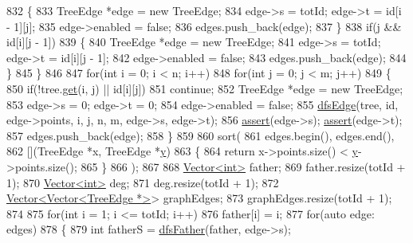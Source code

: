 \begin{DoxyCode}
832             \{
833                 TreeEdge *edge = \textcolor{keyword}{new} TreeEdge;
834                 edge->s = totId; edge->t = \textcolor{keywordtype}{id}[i - 1][j];
835                 edge->enabled = \textcolor{keyword}{false};
836                 edges.push\_back(edge);
837             \}
838             \textcolor{keywordflow}{if}(j && \textcolor{keywordtype}{id}[i][j - 1])
839             \{
840                 TreeEdge *edge = \textcolor{keyword}{new} TreeEdge;
841                 edge->s = totId; edge->t = \textcolor{keywordtype}{id}[i][j - 1];
842                 edge->enabled = \textcolor{keyword}{false};
843                 edges.push\_back(edge);
844             \}
845         \}
846     
847     \textcolor{keywordflow}{for}(\textcolor{keywordtype}{int} i = 0; i < n; i++)
848         \textcolor{keywordflow}{for}(\textcolor{keywordtype}{int} j = 0; j < m; j++)
849         \{
850             \textcolor{keywordflow}{if}(!tree.\hyperlink{classBitMatrix_ad19d1045b54ccc8a99d70d38305b4ca6}{get}(i, j) || \textcolor{keywordtype}{id}[i][j])
851                 \textcolor{keywordflow}{continue};
852             TreeEdge *edge = \textcolor{keyword}{new} TreeEdge;
853             edge->s = 0; edge->t = 0;
854             edge->enabled = \textcolor{keyword}{false};
855             \hyperlink{classColumnGenSolve_a96cbeba5fb978bb67e32b8f42ba161fe}{dfsEdge}(tree, \textcolor{keywordtype}{id}, edge->points, i, j, n, m, edge->s, edge->t);
856             \hyperlink{global_8h_af576bf8ffa22a44e53018c67095ffbf0}{assert}(edge->s); \hyperlink{global_8h_af576bf8ffa22a44e53018c67095ffbf0}{assert}(edge->t);
857             edges.push\_back(edge);
858         \}
859     
860     sort(
861         edges.begin(), edges.end(),
862         [](TreeEdge *x, TreeEdge *\hyperlink{classes_8txt_a52673b1e0cce0104e52dcd12727f211e}{y})
863         \{
864             \textcolor{keywordflow}{return} x->points.size() < \hyperlink{classes_8txt_a52673b1e0cce0104e52dcd12727f211e}{y}->points.size();
865         \}
866     );
867     
868     \hyperlink{classVector}{Vector<int>} father;
869     father.resize(totId + 1);
870     \hyperlink{classVector}{Vector<int>} deg;
871     deg.resize(totId + 1);
872     \hyperlink{classVector}{Vector<Vector<TreeEdge *>}> graphEdges;
873     graphEdges.resize(totId + 1);
874     
875     \textcolor{keywordflow}{for}(\textcolor{keywordtype}{int} i = 1; i <= totId; i++)
876         father[i] = i;
877     \textcolor{keywordflow}{for}(\textcolor{keyword}{auto} edge: edges)
878     \{
879         \textcolor{keywordtype}{int} fatherS = \hyperlink{classColumnGenSolve_af3470aaed4b9d0aa92f27b487b093479}{dfsFather}(father, edge->s);

\end{DoxyCode}
